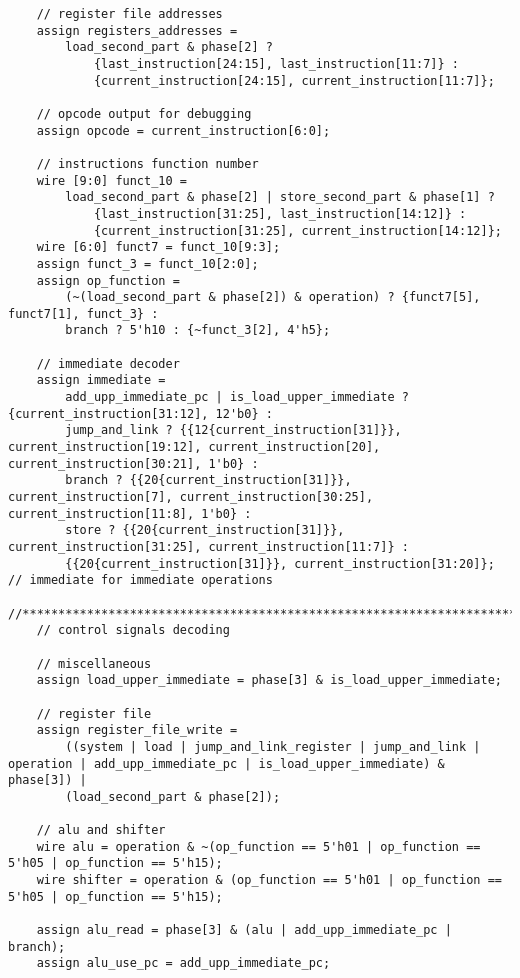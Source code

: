 \begin{lstlisting}
    // register file addresses
    assign registers_addresses = 
        load_second_part & phase[2] ? 
            {last_instruction[24:15], last_instruction[11:7]} : 
            {current_instruction[24:15], current_instruction[11:7]};
    
    // opcode output for debugging
    assign opcode = current_instruction[6:0];

    // instructions function number
    wire [9:0] funct_10 = 
        load_second_part & phase[2] | store_second_part & phase[1] ? 
            {last_instruction[31:25], last_instruction[14:12]} : 
            {current_instruction[31:25], current_instruction[14:12]};
    wire [6:0] funct7 = funct_10[9:3];
    assign funct_3 = funct_10[2:0];  
    assign op_function = 
        (~(load_second_part & phase[2]) & operation) ? {funct7[5], funct7[1], funct_3} :
        branch ? 5'h10 : {~funct_3[2], 4'h5};

    // immediate decoder
    assign immediate =  
        add_upp_immediate_pc | is_load_upper_immediate ? {current_instruction[31:12], 12'b0} :
        jump_and_link ? {{12{current_instruction[31]}}, current_instruction[19:12], current_instruction[20], current_instruction[30:21], 1'b0} :
        branch ? {{20{current_instruction[31]}}, current_instruction[7], current_instruction[30:25], current_instruction[11:8], 1'b0} :
        store ? {{20{current_instruction[31]}}, current_instruction[31:25], current_instruction[11:7]} : 
        {{20{current_instruction[31]}}, current_instruction[31:20]}; // immediate for immediate operations

//********************************************************************************************************************//
    // control signals decoding

    // miscellaneous
    assign load_upper_immediate = phase[3] & is_load_upper_immediate;

    // register file
    assign register_file_write = 
        ((system | load | jump_and_link_register | jump_and_link | operation | add_upp_immediate_pc | is_load_upper_immediate) & phase[3]) | 
        (load_second_part & phase[2]);
    
    // alu and shifter
    wire alu = operation & ~(op_function == 5'h01 | op_function == 5'h05 | op_function == 5'h15);
    wire shifter = operation & (op_function == 5'h01 | op_function == 5'h05 | op_function == 5'h15);
    
    assign alu_read = phase[3] & (alu | add_upp_immediate_pc | branch);
    assign alu_use_pc = add_upp_immediate_pc;


\end{lstlisting}
